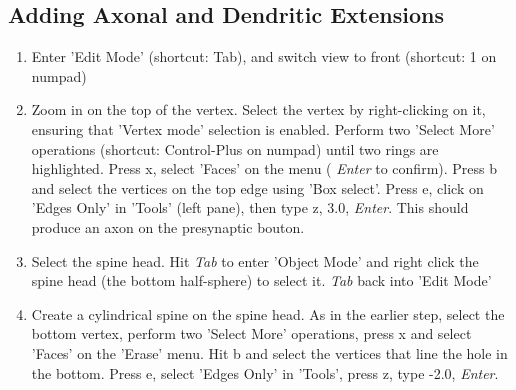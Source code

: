 \documentclass[twoside,a4paper]{refart}
\begin{document}
\subsection{Adding Axonal and Dendritic Extensions}

\begin{enumerate}

\item   Enter 'Edit Mode' (shortcut: Tab), and switch view to front (shortcut: 1 on numpad)

\item   Zoom in on the top of the vertex. Select the vertex by right-clicking on it, ensuring that 'Vertex mode' selection is enabled. Perform two 'Select More' operations (shortcut: Control-Plus on numpad) until two rings are highlighted. Press x, select 'Faces' on the menu ( \textit{Enter} to confirm). Press b and select the vertices on the top edge using 'Box select'. Press e, click on 'Edges Only' in 'Tools' (left pane), then type z, 3.0, \textit{Enter}. This should produce an axon on the presynaptic bouton.

\item   Select the spine head. Hit \textit{Tab} to enter 'Object Mode' and right click the spine head (the bottom half-sphere) to select it. \textit{Tab} back into 'Edit Mode'

\item   Create a cylindrical spine on the spine head. As in the earlier step, select the bottom vertex, perform two 'Select More' operations, press x and select 'Faces' on the 'Erase' menu. Hit b and select the vertices that line the hole in the bottom. Press e, select 'Edges Only' in 'Tools', press z, type -2.0, \textit{Enter}. 

\end{enumerate}
\end{document}
